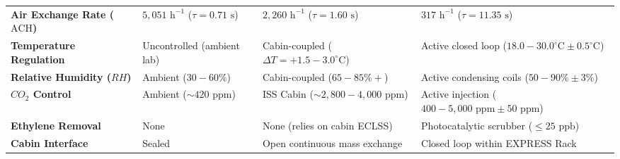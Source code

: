 \begin{table}[t]
\begin{tabularx}{\textwidth}{lXXX}
\textbf{Air Exchange Rate ($\text{ACH}$)} & $5,051\text{ h}^{-1}$ ($\tau = 0.71\text{ s}$) & $2,260\text{ h}^{-1}$ ($\tau = 1.60\text{ s}$) & $317\text{ h}^{-1}$ ($\tau = 11.35\text{ s}$) \\
\textbf{Temperature Regulation} & Uncontrolled (ambient lab) & Cabin-coupled ($\Delta T = +1.5 - 3.0^\circ\text{C}$) & Active closed loop ($18.0 - 30.0^\circ\text{C} \pm 0.5^\circ\text{C}$) \\
\textbf{Relative Humidity ($RH$)} & Ambient ($30 - 60\%$) & Cabin-coupled ($65 - 85\%+$) & Active condensing coils ($50 - 90\% \pm 3\%$) \\
\textbf{$CO_2$ Control} & Ambient ($\sim420\text{ ppm}$) & ISS Cabin ($\sim2,800 - 4,000\text{ ppm}$) & Active injection ($400 - 5,000\text{ ppm} \pm 50\text{ ppm}$) \\
\textbf{Ethylene Removal} & None & None (relies on cabin ECLSS) & Photocatalytic scrubber ($\le25\text{ ppb}$) \\
\textbf{Cabin Interface} & Sealed & Open continuous mass exchange & Closed loop within EXPRESS Rack \\
\bottomrule
\end{tabularx}
\end{table}
